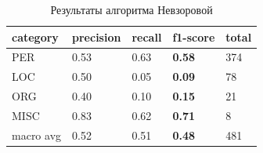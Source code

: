 \newpage

\begin{table}[h!]
\begin{tabular}{| l | l | l | l | l |}
\hline


 category &precision  &  recall & \textbf{f1-score} &  total\\
 \hline
 PER& 0.53&0.63&\textbf{0.58}& 374 \\
  \hline
 LOC& 0.50&0.05&\textbf{0.09}&  78 \\
  \hline
 ORG& 0.40&0.10&\textbf{0.15}&  21 \\ 
  \hline
 MISC& 0.83&0.62&\textbf{0.71}&   8 \\ 
 \hline
 \hline

 macro avg& 0.52&0.51&\textbf{0.48}& 481 \\
\hline
\end{tabular}

\caption{Результаты алгоритма Невзоровой}
\label{table:Nevzorova_res_1}
\end{table}

